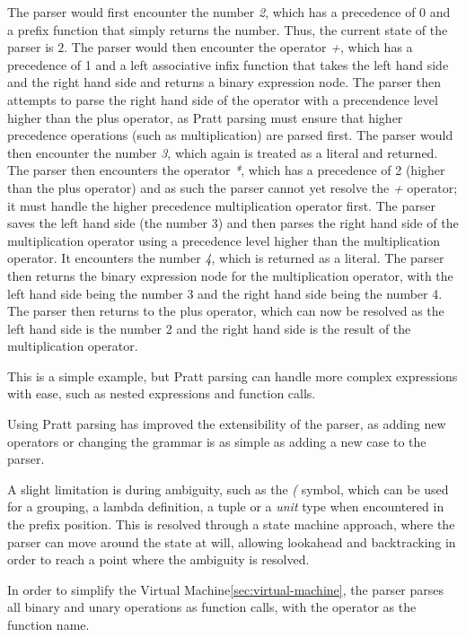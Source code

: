 The parser would first encounter the number \textit{2}, which has a precedence of 0 and a prefix function that
simply returns the number.
Thus, the current state of the parser is $2$.
The parser would then encounter the operator \textit{+}, which has a precedence of 1 and a left associative infix
function that takes the left hand side and the right hand side and returns a binary expression node.
The parser then attempts to parse the right hand side of the operator with a precendence level higher than the
plus operator, as Pratt parsing must ensure that higher precedence operations (such as multiplication) are parsed
first.
The parser would then encounter the number \textit{3}, which again is treated as a literal and returned.
The parser then encounters the operator \textit{*}, which has a precedence of 2 (higher than the plus operator) and 
as such the parser cannot yet resolve the \textit{+} operator; it must handle the higher precedence multiplication
operator first.
The parser saves the left hand side (the number 3) and then parses the right hand side of the multiplication 
operator using a precedence level higher than the multiplication operator.
It encounters the number \textit{4}, which is returned as a literal.
The parser then returns the binary expression node for the multiplication operator, with the left hand side being
the number 3 and the right hand side being the number 4.
The parser then returns to the plus operator, which can now be resolved as the left hand side is the number 2 and the
right hand side is the result of the multiplication operator.

This is a simple example, but Pratt parsing can handle more complex expressions with ease, such as nested
expressions and function calls.

Using Pratt parsing has improved the extensibility of the parser, as adding new operators or changing the grammar
is as simple as adding a new case to the parser.

A slight limitation is during ambiguity, such as the \textit{(} symbol, which can be used for a grouping, a lambda 
definition, a tuple or a \textit{unit} type when encountered in the prefix position.
This is resolved through a state machine approach, where the parser can move around the state at will, allowing 
lookahead and backtracking in order to reach a point where the ambiguity is resolved.

In order to simplify the Virtual Machine\ref{sec:virtual-machine}, the parser parses all binary and unary operations 
as function calls, with the operator as the function name.

